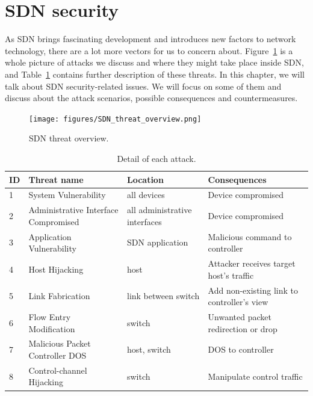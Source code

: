 \section{SDN security}
\label{SDN security}
As SDN brings fascinating development and introduces new factors to network technology, there are a lot more vectors for us to concern about. Figure~\ref{SND_threat_overview} is a whole picture of attacks we discuss and where they might take place inside SDN, and Table~\ref{table:sdn_threats} contains further description of these threats. In this chapter, we will talk about SDN security-related issues. We will focus on some of them and discuss about the attack scenarios, possible consequences and countermeasures. 

\begin{figure}[H]
\begin{center} 
\texttt{[image: figures/SDN\_threat\_overview.png]}
\end{center}
\caption{SDN threat overview.}
\label{SND_threat_overview}
\end{figure}

\begin{table}[H]
\centering
\caption{Detail of each attack.}
\begin{tabular}{|l|p{4cm}|p{3.2cm}|p{5cm}|}
\hline ID & Threat name	& Location & Consequences \\
\hline
\hline 1 & System Vulnerability & all devices & Device compromised\\
\hline 2 & Administrative Interface Compromised & all administrative interfaces & Device compromised \\
\hline 3 & Application Vulnerability & SDN application & Malicious command to controller \\
\hline 4 & Host Hijacking & host & Attacker receives target host's traffic \\
\hline 5 & Link Fabrication & link between switch & Add non-existing link to controller's view \\
\hline 6 & Flow Entry Modification & switch & Unwanted packet redirection or drop \\
\hline 7 & Malicious Packet Controller DOS  & host, switch & DOS to controller \\
\hline 8 & Control-channel Hijacking & switch & Manipulate control traffic \\
\hline 
\end{tabular}
\label{table:sdn_threats}
\end{table}

